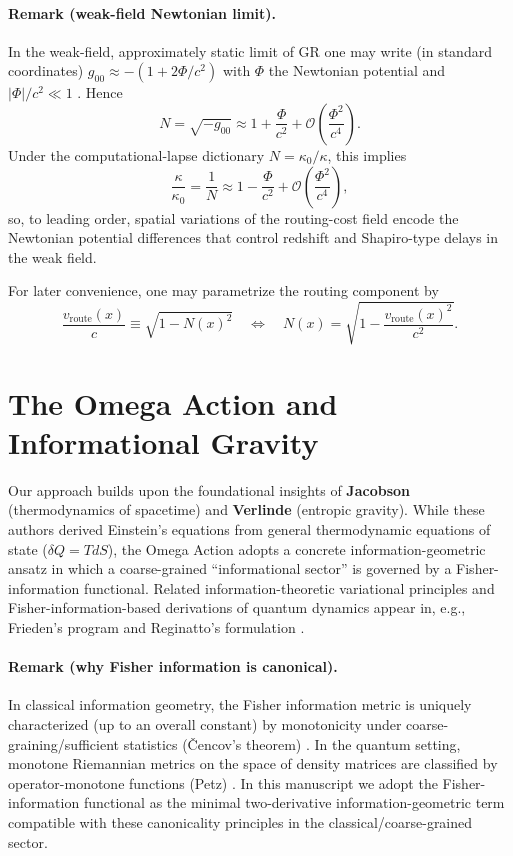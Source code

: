 \paragraph{Remark (weak-field Newtonian limit).}
In the weak-field, approximately static limit of GR one may write (in standard coordinates) $g_{00}\approx -(1+2\Phi/c^2)$ with $\Phi$ the Newtonian potential and $|\Phi|/c^2\ll 1$ \cite{Carroll2004}. Hence
\begin{equation}
    N=\sqrt{-g_{00}}\approx 1+\frac{\Phi}{c^2}+\mathcal{O}\!\left(\frac{\Phi^2}{c^4}\right).
\end{equation}
Under the computational-lapse dictionary $N=\kappa_0/\kappa$, this implies
\begin{equation}
    \frac{\kappa}{\kappa_0}=\frac{1}{N}\approx 1-\frac{\Phi}{c^2}+\mathcal{O}\!\left(\frac{\Phi^2}{c^4}\right),
\end{equation}
so, to leading order, spatial variations of the routing-cost field encode the Newtonian potential differences that control redshift and Shapiro-type delays in the weak field.

For later convenience, one may parametrize the routing component by
\begin{equation}
    \frac{v_{\text{route}}(x)}{c}\equiv \sqrt{1-N(x)^2}
    \quad\Longleftrightarrow\quad
    N(x)=\sqrt{1-\frac{v_{\text{route}}(x)^2}{c^2}}.
\end{equation}

\section{The Omega Action and Informational Gravity}
\label{chap:omega_action}

Our approach builds upon the foundational insights of \textbf{Jacobson} \cite{Jacobson1995} (thermodynamics of spacetime) and \textbf{Verlinde} \cite{Verlinde2011} (entropic gravity). While these authors derived Einstein's equations from general thermodynamic equations of state ($\delta Q = T dS$), the Omega Action adopts a concrete information-geometric ansatz in which a coarse-grained ``informational sector'' is governed by a Fisher-information functional.
Related information-theoretic variational principles and Fisher-information-based derivations of quantum dynamics appear in, e.g., Frieden's program and Reginatto's formulation \cite{Frieden1998, Reginatto1998}.
\paragraph{Remark (why Fisher information is canonical).}
In classical information geometry, the Fisher information metric is uniquely characterized (up to an overall constant) by monotonicity under coarse-graining/sufficient statistics (Čencov's theorem) \cite{Chentsov1982,AmariNagaoka2000}. In the quantum setting, monotone Riemannian metrics on the space of density matrices are classified by operator-monotone functions (Petz) \cite{Petz1996}. In this manuscript we adopt the Fisher-information functional as the minimal two-derivative information-geometric term compatible with these canonicality principles in the classical/coarse-grained sector.

